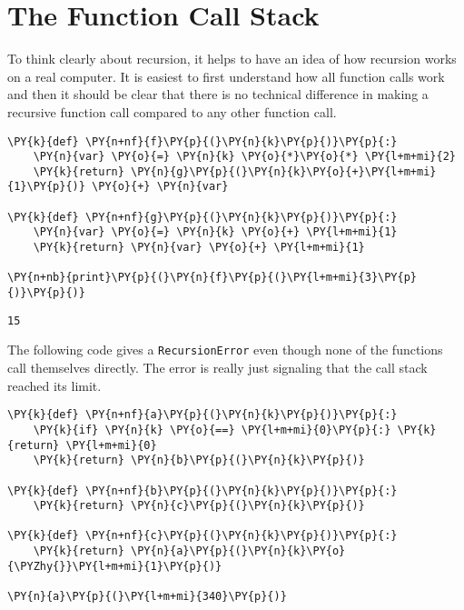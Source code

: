 \section{The Function Call Stack}


To think clearly about recursion, it helps to have an idea of how recursion works on a real computer.
It is easiest to first understand how all function calls work and then it should be clear that there is no technical difference in making a recursive function call compared to any other function call.


\begin{Verbatim}[commandchars=\\\{\}]
\PY{k}{def} \PY{n+nf}{f}\PY{p}{(}\PY{n}{k}\PY{p}{)}\PY{p}{:}
    \PY{n}{var} \PY{o}{=} \PY{n}{k} \PY{o}{*}\PY{o}{*} \PY{l+m+mi}{2}
    \PY{k}{return} \PY{n}{g}\PY{p}{(}\PY{n}{k}\PY{o}{+}\PY{l+m+mi}{1}\PY{p}{)} \PY{o}{+} \PY{n}{var}

\PY{k}{def} \PY{n+nf}{g}\PY{p}{(}\PY{n}{k}\PY{p}{)}\PY{p}{:}
    \PY{n}{var} \PY{o}{=} \PY{n}{k} \PY{o}{+} \PY{l+m+mi}{1}
    \PY{k}{return} \PY{n}{var} \PY{o}{+} \PY{l+m+mi}{1}

\PY{n+nb}{print}\PY{p}{(}\PY{n}{f}\PY{p}{(}\PY{l+m+mi}{3}\PY{p}{)}\PY{p}{)}
\end{Verbatim}

\begin{Verbatim}
15
\end{Verbatim}


The following code gives a \texttt{RecursionError} even though none of the functions call themselves directly.
The error is really just signaling that the call stack reached its limit.

\begin{Verbatim}[commandchars=\\\{\}]
\PY{k}{def} \PY{n+nf}{a}\PY{p}{(}\PY{n}{k}\PY{p}{)}\PY{p}{:}
    \PY{k}{if} \PY{n}{k} \PY{o}{==} \PY{l+m+mi}{0}\PY{p}{:} \PY{k}{return} \PY{l+m+mi}{0}
    \PY{k}{return} \PY{n}{b}\PY{p}{(}\PY{n}{k}\PY{p}{)}

\PY{k}{def} \PY{n+nf}{b}\PY{p}{(}\PY{n}{k}\PY{p}{)}\PY{p}{:}
    \PY{k}{return} \PY{n}{c}\PY{p}{(}\PY{n}{k}\PY{p}{)}

\PY{k}{def} \PY{n+nf}{c}\PY{p}{(}\PY{n}{k}\PY{p}{)}\PY{p}{:}
    \PY{k}{return} \PY{n}{a}\PY{p}{(}\PY{n}{k}\PY{o}{\PYZhy{}}\PY{l+m+mi}{1}\PY{p}{)}

\PY{n}{a}\PY{p}{(}\PY{l+m+mi}{340}\PY{p}{)}
\end{Verbatim}



